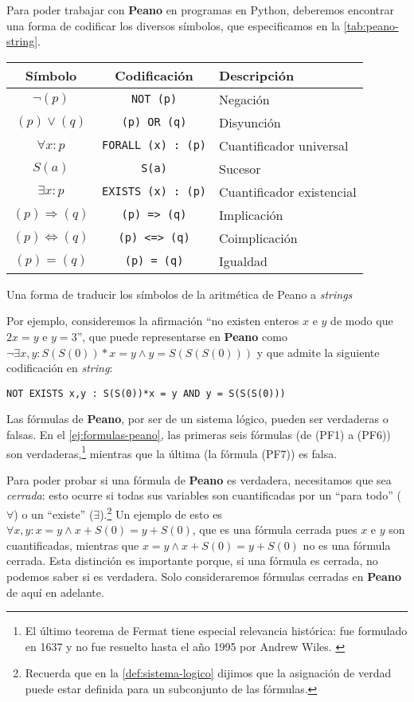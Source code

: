 Para poder trabajar con \textbf{Peano} en programas en Python, deberemos encontrar una forma de codificar los diversos símbolos, que especificamos en la \cref{tab:peano-string}.
\begin{tabla}
\begin{table}[H]
\centering
\begin{tabular}{@{}ccl@{}}
\toprule
Símbolo & Codificación & Descripción \\ \midrule
$\neg(p)$ & \texttt{NOT (p)} & Negación \\
$(p) \vee (q)$ & \texttt{(p) OR (q)} & Disyunción \\
$\forall x : p$ & \texttt{FORALL (x) : (p)} & Cuantificador universal \\
$S(a)$ & \texttt{S(a)} & Sucesor \\
$\exists x : p$ & \texttt{EXISTS (x) : (p)} & Cuantificador existencial \\
$(p) \Rightarrow (q)$ & \texttt{(p)}\texttt{ }\texttt{=>}\texttt{ }\texttt{(q)} & Implicación \\
$(p) \iff (q)$ & \texttt{(p)}\texttt{ }\texttt{<=>}\texttt{ }\texttt{(q)} & Coimplicación \\
$(p)=(q)$ & \texttt{(p) = (q)} & Igualdad \\\bottomrule
\end{tabular}
\end{table}
\vspace{-8pt}
\caption{Una forma de traducir los símbolos de la aritmética de Peano a \emph{strings}}
\label{tab:peano-string}
\end{tabla}
Por ejemplo, consideremos la afirmación ``no existen enteros $x$ e $y$ de modo que $2x=y$ e $y=3$'', que puede representarse en \textbf{Peano} como $\neg\exists x, y : S(S(0))*x = y \wedge y = S(S(S(0)))$ y que admite la siguiente codificación en \emph{string}:
\begin{lstlisting}[numbers=none,frame=none]
NOT EXISTS x,y : S(S(0))*x = y AND y = S(S(S(0)))
\end{lstlisting}
Las fórmulas de \textbf{Peano}, por ser de un sistema lógico, pueden ser verdaderas o falsas. En el \cref{ej:formulas-peano}, las primeras seis fórmulas (de (PF1) a (PF6)) son verdaderas,\footnote{El último teorema de Fermat tiene especial relevancia histórica: fue formulado en 1637 y no fue resuelto hasta el año 1995 por Andrew Wiles. \cite{Wiles1995}} mientras que la última (la fórmula (PF7)) es falsa.

Para poder probar si una fórmula de \textbf{Peano} es verdadera, necesitamos que sea \emph{cerrada}: esto ocurre si todas sus variables son cuantificadas por un ``para todo'' ($\forall$) o un ``existe'' ($\exists$).\footnote{Recuerda que en la \cref{def:sistema-logico} dijimos que la asignación de verdad puede estar definida para un subconjunto de las fórmulas.} Un ejemplo de esto es $\forall x,y : x=y \wedge x+S(0)=y+S(0)$, que es una fórmula cerrada pues $x$ e $y$ son cuantificadas, mientras que $x=y \wedge x+S(0)=y+S(0)$ no es una fórmula cerrada. Esta distinción es importante porque, si una fórmula es cerrada, no podemos saber si es verdadera. Solo consideraremos fórmulas cerradas en \textbf{Peano} de aquí en adelante.

